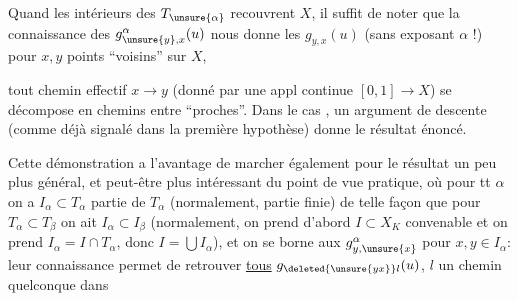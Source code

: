 Quand les intérieurs des $T_{\unsure{\alpha}}$ recouvrent $X$, il suffit de noter que la connaissance des $g_{\unsure{y},x}^{\alpha}(u)$ nous donne les $g_{y,x}(u)$ (sans exposant $\alpha$ !) pour $x,y$ points ``voisins'' sur $X$,


 tout chemin effectif $x\longrightarrow y$ (donné par une appl continue $[0,1]\longrightarrow X$) se décompose en  chemins 
entre   ``proches''. Dans le cas ,  un argument de descente (comme déjà signalé dans la première hypothèse) donne le résultat énoncé.

Cette  démonstration a l'avantage de marcher également pour  le résultat un peu plus général, et peut-être plus intéressant du point de vue pratique, où pour tt $\alpha$ on a $I_\alpha\subset T_\alpha$ partie  de $T_\alpha$ (normalement, partie finie) de telle façon que pour $T_\alpha\subset T_\beta$ on ait $I_\alpha\subset I_\beta$  (normalement, on prend d'abord $I\subset X_K$ convenable et on prend $I_\alpha=I\cap T_\alpha$, donc $I=\bigcup I_\alpha$), et on se borne aux $g^\alpha_{y,\unsure{x}}$ pour $x,y\in I_\alpha$: leur connaissance permet de retrouver \uline{tous}  $g_{\deleted{\unsure{yx}}l}(u)$, $l$ un chemin quelconque dans


